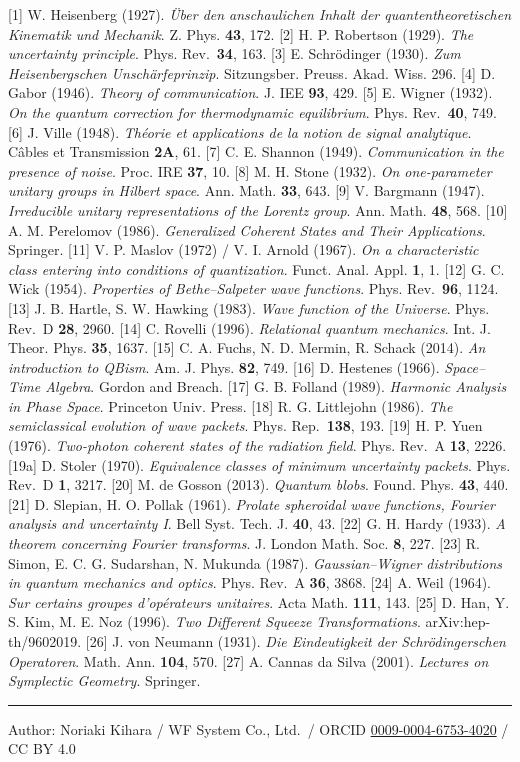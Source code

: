 \documentclass[
]{article}
\begin{document}
{[}1{]} W. Heisenberg (1927). \emph{Über den anschaulichen Inhalt der
quantentheoretischen Kinematik und Mechanik}. Z. Phys. \textbf{43}, 172.
{[}2{]} H. P. Robertson (1929). \emph{The uncertainty principle}. Phys.
Rev.~\textbf{34}, 163. {[}3{]} E. Schrödinger (1930). \emph{Zum
Heisenbergschen Unschärfeprinzip}. Sitzungsber. Preuss. Akad. Wiss. 296.
{[}4{]} D. Gabor (1946). \emph{Theory of communication}. J. IEE
\textbf{93}, 429. {[}5{]} E. Wigner (1932). \emph{On the quantum
correction for thermodynamic equilibrium}. Phys. Rev.~\textbf{40}, 749.
{[}6{]} J. Ville (1948). \emph{Théorie et applications de la notion de
signal analytique}. Câbles et Transmission \textbf{2A}, 61. {[}7{]} C.
E. Shannon (1949). \emph{Communication in the presence of noise}. Proc.
IRE \textbf{37}, 10. {[}8{]} M. H. Stone (1932). \emph{On one-parameter
unitary groups in Hilbert space}. Ann. Math. \textbf{33}, 643. {[}9{]}
V. Bargmann (1947). \emph{Irreducible unitary representations of the
Lorentz group}. Ann. Math. \textbf{48}, 568. {[}10{]} A. M. Perelomov
(1986). \emph{Generalized Coherent States and Their Applications}.
Springer. {[}11{]} V. P. Maslov (1972) / V. I. Arnold (1967). \emph{On a
characteristic class entering into conditions of quantization}. Funct.
Anal. Appl. \textbf{1}, 1. {[}12{]} G. C. Wick (1954). \emph{Properties
of Bethe--Salpeter wave functions}. Phys. Rev.~\textbf{96}, 1124.
{[}13{]} J. B. Hartle, S. W. Hawking (1983). \emph{Wave function of the
Universe}. Phys. Rev.~D \textbf{28}, 2960. {[}14{]} C. Rovelli (1996).
\emph{Relational quantum mechanics}. Int. J. Theor. Phys. \textbf{35},
1637. {[}15{]} C. A. Fuchs, N. D. Mermin, R. Schack (2014). \emph{An
introduction to QBism}. Am. J. Phys. \textbf{82}, 749. {[}16{]} D.
Hestenes (1966). \emph{Space--Time Algebra}. Gordon and Breach. {[}17{]}
G. B. Folland (1989). \emph{Harmonic Analysis in Phase Space}. Princeton
Univ. Press. {[}18{]} R. G. Littlejohn (1986). \emph{The semiclassical
evolution of wave packets}. Phys. Rep.~\textbf{138}, 193. {[}19{]} H. P.
Yuen (1976). \emph{Two-photon coherent states of the radiation field}.
Phys. Rev.~A \textbf{13}, 2226. {[}19a{]} D. Stoler (1970).
\emph{Equivalence classes of minimum uncertainty packets}. Phys. Rev.~D
\textbf{1}, 3217. {[}20{]} M. de Gosson (2013). \emph{Quantum blobs}.
Found. Phys. \textbf{43}, 440. {[}21{]} D. Slepian, H. O. Pollak (1961).
\emph{Prolate spheroidal wave functions, Fourier analysis and
uncertainty I}. Bell Syst. Tech. J. \textbf{40}, 43. {[}22{]} G. H.
Hardy (1933). \emph{A theorem concerning Fourier transforms}. J. London
Math. Soc. \textbf{8}, 227. {[}23{]} R. Simon, E. C. G. Sudarshan, N.
Mukunda (1987). \emph{Gaussian--Wigner distributions in quantum
mechanics and optics}. Phys. Rev.~A \textbf{36}, 3868. {[}24{]} A. Weil
(1964). \emph{Sur certains groupes d'opérateurs unitaires}. Acta Math.
\textbf{111}, 143. {[}25{]} D. Han, Y. S. Kim, M. E. Noz (1996).
\emph{Two Different Squeeze Transformations}. arXiv:hep-th/9602019.
{[}26{]} J. von Neumann (1931). \emph{Die Eindeutigkeit der
Schrödingerschen Operatoren}. Math. Ann. \textbf{104}, 570. {[}27{]} A.
Cannas da Silva (2001). \emph{Lectures on Symplectic Geometry}.
Springer.

\begin{center}\rule{0.5\linewidth}{0.5pt}\end{center}

Author: Noriaki Kihara / WF System Co., Ltd.~/ ORCID
\href{https://orcid.org/0009-0004-6753-4020}{0009-0004-6753-4020} / CC
BY 4.0
\end{document}
